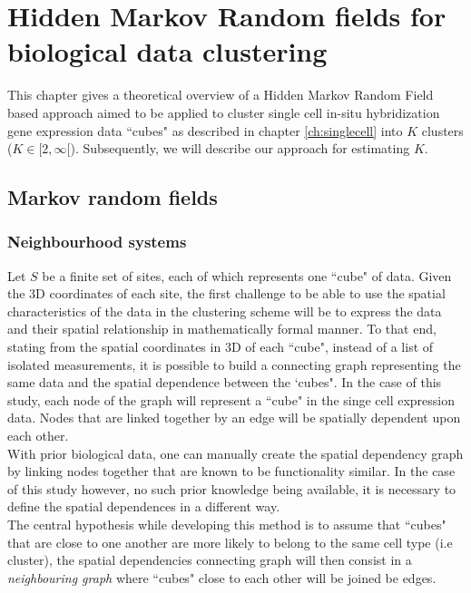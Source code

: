 \chapter{Hidden Markov Random fields for biological data clustering}\label{ch:HMRF} 
This chapter gives a theoretical overview of a Hidden Markov Random Field based approach aimed to be applied to cluster single cell in-situ hybridization gene expression data ``cubes" as described in chapter \ref{ch:singlecell} into $K$ clusters ($K \in [2,\infty[$). Subsequently, we will describe our approach for estimating $K$.

\section{Markov random fields}

	\subsection{Neighbourhood systems}\label{sec:neighbours}
Let $S$ be a finite set of sites, each of which represents one ``cube" of data. Given the 3D coordinates of each site, the first challenge to be able to use the spatial characteristics of the data in the clustering scheme will be to express the data and their spatial relationship in mathematically formal manner. To that end, stating from the spatial coordinates in 3D of each ``cube", instead of a list of isolated measurements, it is possible to build a connecting graph representing the same data and the spatial dependence between the `cubes". In the case of this study, each node of the graph will represent a ``cube" in the singe cell expression data. Nodes that are linked together by an edge will be spatially dependent upon each other.\\

With prior biological data, one can manually create the spatial dependency graph by linking nodes together that are known to be functionality similar. In the case of this study however, no such prior knowledge being available, it is necessary to define the spatial dependences in a different way.\\

The central hypothesis while developing this method is to assume that ``cubes" that are close to one another are more likely to belong to the same cell type (i.e cluster), the spatial dependencies connecting graph will then consist in a \emph{neighbouring graph} where  ``cubes" close to each other will be joined be edges.\\

